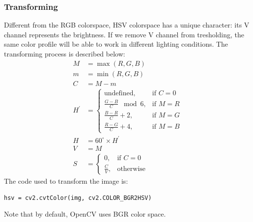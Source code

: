 \subsubsection{Transforming}
Different from the RGB colorspace, HSV colorspace has a unique character: its V channel represents the brightness. If we remove V channel from tresholding, the same color profile will be able to work in different lighting conditions.
The transforming process is described below\cite{cite4}:
\begin{align}
  M &= \operatorname{max}(R, G, B) \\
  m &= \operatorname{min}(R, G, B) \\
  C &= M - m\\
  H^\prime &=
    \begin{cases}
      \mathrm{undefined},        &\mbox{if } C = 0 \\
      \frac{G - B}{C} \;\bmod 6, &\mbox{if } M = R \\
      \frac{B - R}{C} + 2,       &\mbox{if } M = G \\
      \frac{R - G}{C} + 4,       &\mbox{if } M = B
    \end{cases} \\
  H        &= 60^\circ \times H^\prime\\
  V &= M\\
   S &=
    \begin{cases}
      0,           &\mbox{if } C = 0 \\
      \frac{C}{V}, &\mbox{otherwise}
    \end{cases}
\end{align}
The code used to transform the image is:
\begin{lstlisting}
hsv = cv2.cvtColor(img, cv2.COLOR_BGR2HSV)
\end{lstlisting}
Note that by default, OpenCV uses BGR color space.

